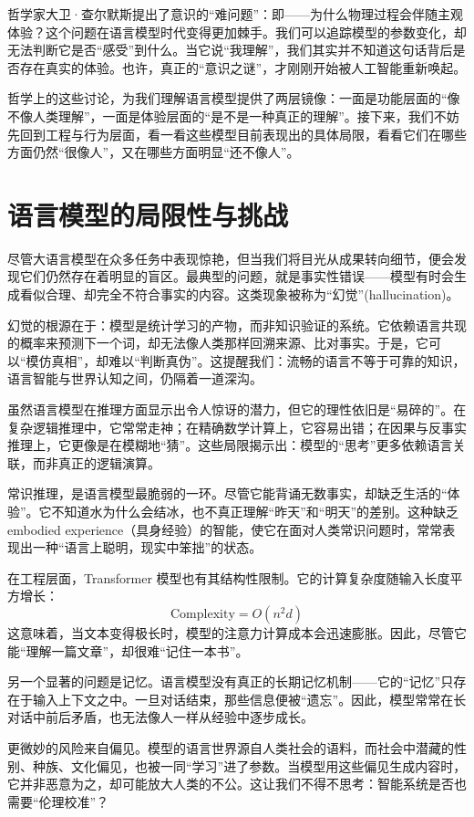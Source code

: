 哲学家大卫·查尔默斯提出了意识的“难问题”：即——为什么物理过程会伴随主观体验？这个问题在语言模型时代变得更加棘手。我们可以追踪模型的参数变化，却无法判断它是否“感受”到什么。当它说“我理解”，我们其实并不知道这句话背后是否存在真实的体验。也许，真正的“意识之谜”，才刚刚开始被人工智能重新唤起。

哲学上的这些讨论，为我们理解语言模型提供了两层镜像：一面是功能层面的“像不像人类理解”，一面是体验层面的“是不是一种真正的理解”。接下来，我们不妨先回到工程与行为层面，看一看这些模型目前表现出的具体局限，看看它们在哪些方面仍然“很像人”，又在哪些方面明显“还不像人”。

\section{语言模型的局限性与挑战}

尽管大语言模型在众多任务中表现惊艳，但当我们将目光从成果转向细节，便会发现它们仍然存在着明显的盲区。最典型的问题，就是事实性错误——模型有时会生成看似合理、却完全不符合事实的内容。这类现象被称为“幻觉”(hallucination)。

幻觉的根源在于：模型是统计学习的产物，而非知识验证的系统。它依赖语言共现的概率来预测下一个词，却无法像人类那样回溯来源、比对事实。于是，它可以“模仿真相”，却难以“判断真伪”。这提醒我们：流畅的语言不等于可靠的知识，语言智能与世界认知之间，仍隔着一道深沟。

虽然语言模型在推理方面显示出令人惊讶的潜力，但它的理性依旧是“易碎的”。在复杂逻辑推理中，它常常走神；在精确数学计算上，它容易出错；在因果与反事实推理上，它更像是在模糊地“猜”。这些局限揭示出：模型的“思考”更多依赖语言关联，而非真正的逻辑演算。

常识推理，是语言模型最脆弱的一环。尽管它能背诵无数事实，却缺乏生活的“体验”。它不知道水为什么会结冰，也不真正理解“昨天”和“明天”的差别。这种缺乏 embodied experience（具身经验）的智能，使它在面对人类常识问题时，常常表现出一种“语言上聪明，现实中笨拙”的状态。

在工程层面，Transformer 模型也有其结构性限制。它的计算复杂度随输入长度平方增长：
\[
\text{Complexity} = O(n^2 d)
\]
这意味着，当文本变得极长时，模型的注意力计算成本会迅速膨胀。因此，尽管它能“理解一篇文章”，却很难“记住一本书”。

另一个显著的问题是记忆。语言模型没有真正的长期记忆机制——它的“记忆”只存在于输入上下文之中。一旦对话结束，那些信息便被“遗忘”。因此，模型常常在长对话中前后矛盾，也无法像人一样从经验中逐步成长。

更微妙的风险来自偏见。模型的语言世界源自人类社会的语料，而社会中潜藏的性别、种族、文化偏见，也被一同“学习”进了参数。当模型用这些偏见生成内容时，它并非恶意为之，却可能放大人类的不公。这让我们不得不思考：智能系统是否也需要“伦理校准”？

